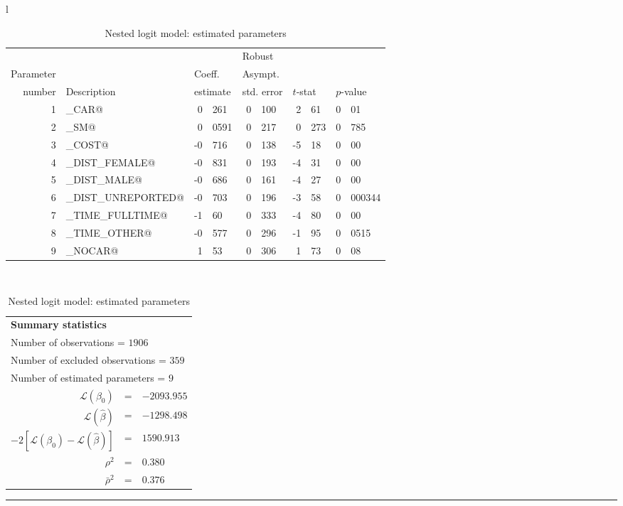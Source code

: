 \documentclass[12pt,a4paper]{article}
\newcommand{\tablefootnote}[1]{\begin{flushright}
\rule{5cm}{1pt}\\
\protect\footnotemark[1]{\footnotesize #1}
\end{flushright}
}
\begin{document}
\begin{table}[htb]
  \begin{tabular}{l}
\begin{tabular}{rlr@{.}lr@{.}lr@{.}lr@{.}l}
         &                       &   \multicolumn{2}{l}{}    & \multicolumn{2}{l}{Robust}  &     \multicolumn{4}{l}{}   \\
Parameter &                       &   \multicolumn{2}{l}{Coeff.}      & \multicolumn{2}{l}{Asympt.}  &     \multicolumn{4}{l}{}   \\
number &  Description                     &   \multicolumn{2}{l}{estimate}      & \multicolumn{2}{l}{std. error}  &   \multicolumn{2}{l}{$t$-stat}  &   \multicolumn{2}{l}{$p$-value}   \\

\hline

1 & \lstinline@ASC_CAR@ & 0&261 & 0&100 & 2&61 & 0&01\\
2 & \lstinline@ASC_SM@ & 0&0591 & 0&217 & 0&273 & 0&785\\
3 & \lstinline@BETA_COST@ & -0&716 & 0&138 & -5&18 & 0&00\\
4 & \lstinline@BETA_DIST_FEMALE@ & -0&831 & 0&193 & -4&31 & 0&00\\
5 & \lstinline@BETA_DIST_MALE@ & -0&686 & 0&161 & -4&27 & 0&00\\
6 & \lstinline@BETA_DIST_UNREPORTED@ & -0&703 & 0&196 & -3&58 & 0&000344\\
7 & \lstinline@BETA_TIME_FULLTIME@ & -1&60 & 0&333 & -4&80 & 0&00\\
8 & \lstinline@BETA_TIME_OTHER@ & -0&577 & 0&296 & -1&95 & 0&0515\\
9 & \lstinline@NEST_NOCAR@ & 1&53 & 0&306 & 1&73\footnotemark[1] & 0&08\\

\hline
\end{tabular}
\\
\begin{tabular}{rcl}
\multicolumn{3}{l}{\bf Summary statistics}\\
\multicolumn{3}{l}{ Number of observations = $1906$} \\
\multicolumn{3}{l}{ Number of excluded observations = $359$} \\
\multicolumn{3}{l}{ Number of estimated  parameters = $9$} \\
 $\mathcal{L}(\beta_0)$ &=&  $-2093.955$ \\
 $\mathcal{L}(\hat{\beta})$ &=& $-1298.498 $  \\
 $-2[\mathcal{L}(\beta_0) -\mathcal{L}(\hat{\beta})]$ &=& $1590.913$ \\
    $\rho^2$ &=&   $0.380$ \\
    $\bar{\rho}^2$ &=&    $0.376$ \\
\end{tabular}
  \end{tabular}
\tablefootnote{$t$-test against 1} 
\caption{\protect\label{tab:estimatedParameters}Nested logit model: estimated parameters}
\end{table}
\end{document}
